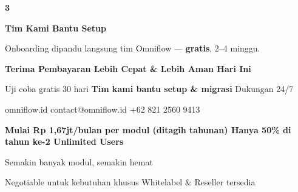 \documentclass[a4paper]{article}
\begin{document}
\begin{center}
\begin{minipage}[t]{0.318\textwidth}
{\begin{minipage}[t][4.7cm][c]{\dimexpr\linewidth-2\fboxsep\relax}
            \begin{center}
                {\fontsize{22}{26}\selectfont\bfseries\color{BluePrimary} 3}
            \end{center}
            \vspace{2pt}
            \begin{center}
                {\fontsize{10}{13}\selectfont\bfseries\color{BlueDark} Tim Kami Bantu Setup}\par\vspace{3pt}
                {\fontsize{9}{12}\selectfont\color{TextDark} Onboarding dipandu langsung tim Omniflow --- \textbf{gratis}, 2--4 minggu.}
            \end{center}
        \end{minipage}}
\end{minipage}
\end{center}

\vspace{8pt}

{\setlength{\fboxsep}{10pt}\setlength{\fboxrule}{0pt}%
\noindent\colorbox{BluePrimary}{%
    \begin{minipage}{\dimexpr\textwidth-2\fboxsep\relax}
        \centering
        {\fontsize{13}{16}\selectfont\bfseries\color{White}
        Terima Pembayaran Lebih Cepat \& Lebih Aman Hari Ini}\par\vspace{3pt}
        {\fontsize{9.5}{12}\selectfont\color{BlueMid}
        Uji coba gratis 30 hari \enspace\textbullet\enspace \textbf{Tim kami bantu setup \& migrasi} \enspace\textbullet\enspace Dukungan 24/7}\par\vspace{2pt}
        {\fontsize{9.5}{12}\selectfont\color{BlueLight}
        omniflow.id \enspace\textbullet\enspace contact@omniflow.id \enspace\textbullet\enspace +62 821 2560 9413}
    \end{minipage}}}


\vspace{6pt}

{\setlength{\fboxsep}{8pt}\setlength{\fboxrule}{0pt}%
\noindent\colorbox{BlueBg}{%
    \begin{minipage}{\dimexpr\textwidth-2\fboxsep\relax}
        \centering
        {\fontsize{9}{12}\selectfont\bfseries\color{BluePrimary}
        Mulai Rp 1,67jt/bulan per modul (ditagih tahunan) \enspace\textbullet\enspace Hanya 50\% di tahun ke-2 \enspace\textbullet\enspace Unlimited Users}\par\vspace{1pt}
        {\fontsize{8.5}{11}\selectfont\color{BlueDark}
        Semakin banyak modul, semakin hemat}\par\vspace{1pt}
        {\fontsize{8}{10}\selectfont\color{TextLight}
        Negotiable untuk kebutuhan khusus \enspace\textbullet\enspace Whitelabel \& Reseller tersedia}
    \end{minipage}}}

\restoregeometry
\pagestyle{empty}
\end{document}
